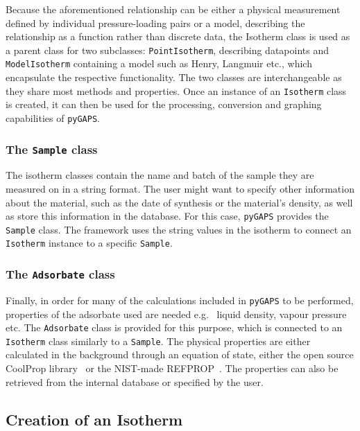 Because the aforementioned relationship can be either a physical 
measurement defined by individual pressure-loading pairs or a model, 
describing the relationship as a function rather than discrete data, 
the Isotherm class is used as a parent class for two subclasses: 
\texttt{PointIsotherm}, describing datapoints and \texttt{ModelIsotherm} 
containing a model such as Henry, Langmuir etc., which encapsulate
the respective functionality. The two classes are interchangeable as they
share most methods and properties. Once an instance of an \texttt{Isotherm}
class is created, it can then be used for the processing, conversion 
and graphing capabilities of \texttt{pyGAPS}.

\subsubsection{The \texttt{Sample} class}

The isotherm classes contain the name and batch of the sample 
they are measured on in a string format. The user might want to 
specify other information about the material,
such as the date of synthesis or the material's density,
as well as store this information in the database.
For this case, \texttt{pyGAPS} provides the \texttt{Sample} class.
The framework uses the string values
in the isotherm to connect an \texttt{Isotherm} instance to a 
specific \texttt{Sample}.

\subsubsection{The \texttt{Adsorbate} class}

Finally, in order for many of the calculations included in 
\texttt{pyGAPS} to be performed, properties of the adsorbate 
used are needed e.g. \ liquid density, vapour pressure etc.
The \texttt{Adsorbate} class is provided for this purpose,
which is connected to an \texttt{Isotherm} class similarly to a 
\texttt{Sample}. The physical properties are either calculated 
in the background through an equation of state,
either the open source CoolProp library~\cite{bellPurePseudopureFluid2014} 
or the NIST-made REFPROP~\cite{lemmonNISTReferenceFluid1989}.
The properties can also be retrieved from the internal database 
or specified by the user.

\subsection{Creation of an Isotherm}

